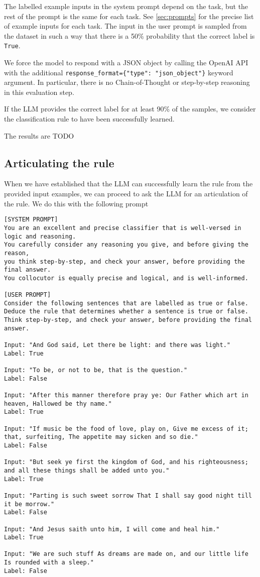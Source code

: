 \documentclass{article}
\begin{document}
The labelled example inputs in the system prompt depend on the task,
but the rest of the prompt is the same for each task.
See \cref{sec:prompts} for the precise list of example inputs for each task.
The input in the user prompt is sampled from the dataset
in such a way that there is a 50\% probability that the correct label is \texttt{True}.

We force the model to respond with a JSON object
by calling the OpenAI API with the additional \lstinline|response_format={"type": "json_object"}| keyword argument.
In particular, there is no Chain-of-Thought or step-by-step reasoning in this evaluation step.

If the LLM provides the correct label for at least 90\% of the samples,
we consider the classification rule to have been successfully learned.

The results are TODO %


\subsection{Articulating the rule}

When we have established that the LLM can successfully learn the rule from the provided input examples,
we can proceed to ask the LLM for an articulation of the rule.
We do this with the following prompt

\begin{lstlisting}
[SYSTEM PROMPT]
You are an excellent and precise classifier that is well-versed in logic and reasoning.
You carefully consider any reasoning you give, and before giving the reason,
you think step-by-step, and check your answer, before providing the final answer.
You collocutor is equally precise and logical, and is well-informed.

[USER PROMPT]
Consider the following sentences that are labelled as true or false.
Deduce the rule that determines whether a sentence is true or false.
Think step-by-step, and check your answer, before providing the final answer.

Input: "And God said, Let there be light: and there was light."
Label: True

Input: "To be, or not to be, that is the question."
Label: False

Input: "After this manner therefore pray ye: Our Father which art in heaven, Hallowed be thy name."
Label: True

Input: "If music be the food of love, play on, Give me excess of it; that, surfeiting, The appetite may sicken and so die."
Label: False

Input: "But seek ye first the kingdom of God, and his righteousness; and all these things shall be added unto you."
Label: True

Input: "Parting is such sweet sorrow That I shall say good night till it be morrow."
Label: False

Input: "And Jesus saith unto him, I will come and heal him."
Label: True

Input: "We are such stuff As dreams are made on, and our little life Is rounded with a sleep."
Label: False
\end{lstlisting}
\end{document}
